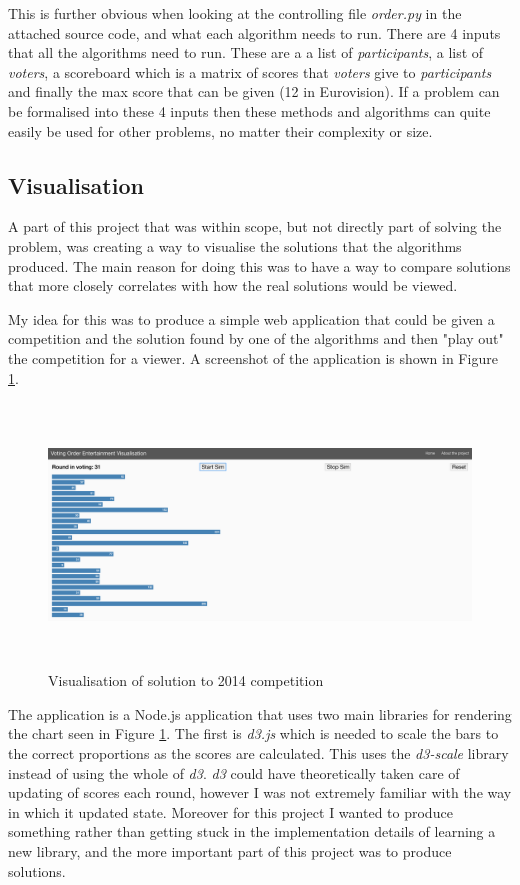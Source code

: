 \documentclass[12pt]{report}
\begin{document}
This is further obvious when looking at the controlling file \textit{order.py} in the attached source code, and what each algorithm needs to run. There are 4 inputs that all the algorithms need to run. These are a a list of \textit{participants}, a list of \textit{voters}, a scoreboard which is a matrix of scores that \textit{voters} give to \textit{participants} and finally the max score that can be given (12 in Eurovision). If a problem can be formalised into these 4 inputs then these methods and algorithms can quite easily be used for other problems, no matter their complexity or size.

\subsection{Visualisation}\label{Imp-Vis}
A part of this project that was within scope, but not directly part of solving the problem, was creating a way to visualise the solutions that the algorithms produced. The main reason for doing this was to have a way to compare solutions that more closely correlates with how the real solutions would be viewed.

My idea for this was to produce a simple web application that could be given a competition and the solution found by one of the algorithms and then "play out" the competition for a viewer. A screenshot of the application is shown in Figure \ref{visScreenshot}.

\begin{figure}[H]
\centering
\includegraphics[width=15cm, height=7cm]{./visualisation}
\caption{Visualisation of solution to 2014 competition}
\label{visScreenshot}
\end{figure}

The application is a Node.js application that uses two main libraries for rendering the chart seen in Figure \ref{visScreenshot}. The first is \textit{d3.js} which is needed to scale the bars to the correct proportions as the scores are calculated. This uses the \textit{d3-scale} library\cite{d3} instead of using the whole of \textit{d3}. \textit{d3} could have theoretically taken care of updating of scores each round, however I was not extremely familiar with the way in which it updated state. Moreover for this project I wanted to produce something rather than getting stuck in the implementation details of learning a new library, and the more important part of this project was to produce solutions.
\end{document}
